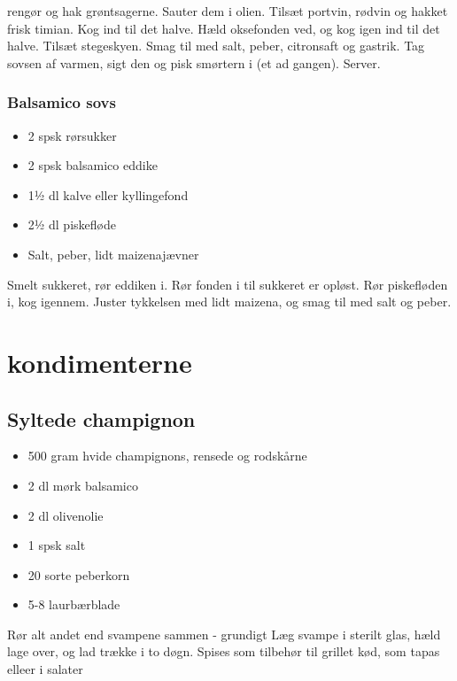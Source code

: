 \documentclass[
]{book}
\providecommand{\tightlist}{%
  \setlength{\itemsep}{0pt}\setlength{\parskip}{0pt}}
\begin{document}
rengør og hak grøntsagerne.
Sauter dem i olien.
Tilsæt portvin, rødvin og hakket frisk timian. Kog ind til det halve.
Hæld oksefonden ved, og kog igen ind til det halve. Tilsæt stegeskyen.
Smag til med salt, peber, citronsaft og gastrik.
Tag sovsen af varmen, sigt den og pisk smørtern i (et ad gangen). Server.

\subsection{Balsamico sovs}\label{balsamico-sovs}

\begin{itemize}
\tightlist
\item
  2 spsk rørsukker
\item
  2 spsk balsamico eddike
\item
  1½ dl kalve eller kyllingefond
\item
  2½ dl piskefløde
\item
  Salt, peber, lidt maizenajævner
\end{itemize}

Smelt sukkeret, rør eddiken i. Rør fonden i til sukkeret er opløst. Rør piskefløden i, kog igennem. Juster tykkelsen med lidt maizena, og smag til med salt og peber.

\chapter{kondimenterne}\label{kondimenterne}

\section{Syltede champignon}\label{syltede-champignon}

\begin{itemize}
\tightlist
\item
  500 gram hvide champignons, rensede og rodskårne
\item
  2 dl mørk balsamico
\item
  2 dl olivenolie
\item
  1 spsk salt
\item
  20 sorte peberkorn
\item
  5-8 laurbærblade
\end{itemize}

Rør alt andet end svampene sammen - grundigt
Læg svampe i sterilt glas, hæld lage over, og lad trække i
to døgn. Spises som tilbehør til grillet kød, som tapas elleer
i salater
\end{document}
